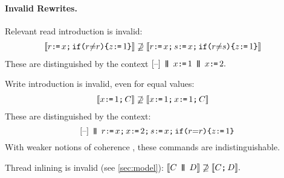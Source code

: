 



\paragraph{Invalid Rewrites.}
Relevant read introduction is invalid:
\begin{align*}
  \sem{\aReg \GETS \aLoc \SEMI \IF{\aReg {\neq} \aReg} \THEN \cLoc \GETS 1 \FI}
  &\not\supseteq
  \sem{\aReg \GETS \aLoc \SEMI \bReg \GETS \aLoc  \SEMI \IF{\aReg {\neq}\bReg} \THEN \cLoc \GETS 1 \FI}
\end{align*}
These are distinguished by the context
\begin{math}
  \hole{} \PAR x\GETS1\PAR x\GETS2.
\end{math}

Write introduction is invalid, even for equal values:
\begin{align*}
  \sem{\aLoc \GETS 1 \SEMI \aCmd} 
  &\not\supseteq
  \sem{\aLoc \GETS 1 \SEMI \aLoc \GETS 1 \SEMI \aCmd}
\end{align*}
These are distinguished by the context:
\begin{displaymath}
  \hole{} \PAR
  r\GETS x \SEMI
  x\GETS2 \SEMI
  s\GETS x\SEMI
  \IF{\aReg {=} \aReg} \THEN \cLoc \GETS 1 \FI
\end{displaymath}
With weaker notions of coherence
\cite{Manson:2005:JMM:1047659.1040336}, these
commands are indistinguishable.

Thread inlining is invalid (see \textsection\ref{sec:model}):
\begin{math}
  \sem{\aCmd \PAR \bCmd}
  \not\supseteq
  \sem{\aCmd \SEMI \bCmd}.
\end{math}


